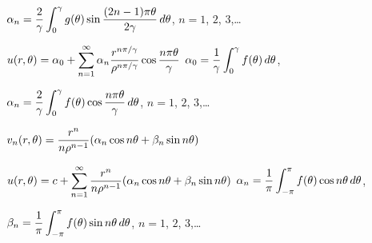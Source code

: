 \quad \quad
$\alpha_{n}=\displaystyle\frac{2}{\gamma}\int_{0}^{\gamma}
g(\theta)\sin\frac{(2n-1)\pi\theta}{2\gamma}\,d\theta$,\quad
 $n=1$, $2$, $3$,\dots

$\displaystyle{u(r,\theta)=\alpha_{0}+\sum_{n=1}^{\infty}\alpha_{n}
\displaystyle\frac{r^{n\pi/\gamma}}{\rho^{n\pi/\gamma}}\cos\frac{n\pi\theta}{\gamma}}$
\quad
$\alpha_{0}=\displaystyle\frac{1}{\gamma}\int_{0}^{\gamma}f(\theta)\,d\theta$,\quad

\quad \quad
$\alpha_{n}=\displaystyle\frac{2}{\gamma}\int_{0}^{\gamma}
f(\theta)\cos\frac{n\pi\theta}{\gamma}\,d\theta$,\;
 $n=1$, $2$, $3$,\dots

$\displaystyle{
v_{n}(r,\theta)=\frac{r^{n}}{n\rho^{n-1}}(\alpha_{n}\cos
n\theta+\beta_{n}\sin n\theta)}$

\quad \quad $u(r,\theta)=\displaystyle{
c+\sum_{n=1}^{\infty}\frac{r^{n}}{n\rho^{n-1}}(\alpha_{n}\cos
n\theta+\beta_{n}\sin n\theta)}$
$\alpha_{n}=\displaystyle{\frac{1}{\pi}\int_{-\pi}^{\pi}f(\theta)\cos
n\theta\,d\theta}$,\quad

\quad \quad
$\displaystyle{\beta_{n}=\frac{1}{\pi}\int_{-\pi}^{\pi}f(\theta)\sin
n\theta\,d\theta}$, $n=1$, $2$, $3$,\dots

